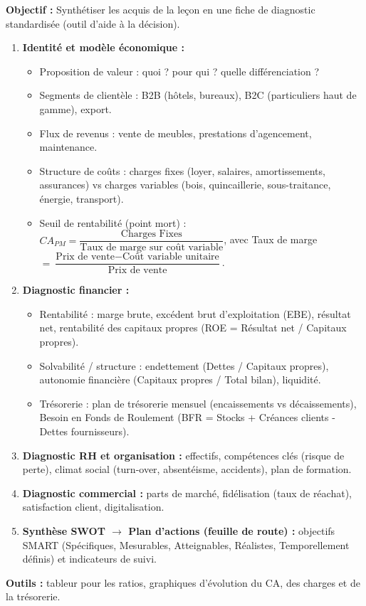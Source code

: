 \documentclass[11pt]{article}
\newcommand{\cle}[1]{{\popxbold\color{popdark}#1}}
\begin{document}
\begin{methode}
    \textbf{Objectif :} Synthétiser les acquis de la leçon en une fiche de diagnostic standardisée (outil d'aide à la décision).
    \begin{enumerate}
        \item \textbf{Identité et modèle économique :}
              \begin{itemize}
                  \item \cle{Proposition de valeur} : quoi ? pour qui ? quelle différenciation ?
                  \item \cle{Segments de clientèle} : B2B (hôtels, bureaux), B2C (particuliers haut de gamme), export.
                  \item \cle{Flux de revenus} : vente de meubles, prestations d'agencement, maintenance.
                  \item \cle{Structure de coûts} : charges fixes (loyer, salaires, amortissements, assurances) vs charges variables (bois, quincaillerie, sous-traitance, énergie, transport).
                  \item \cle{Seuil de rentabilité (point mort)} : $CA_{PM} = \dfrac{\text{Charges Fixes}}{\text{Taux de marge sur coût variable}}$, avec \cle{Taux de marge} $= \dfrac{\text{Prix de vente} - \text{Coût variable unitaire}}{\text{Prix de vente}}$.
              \end{itemize}
        \item \textbf{Diagnostic financier :}
              \begin{itemize}
                  \item \cle{Rentabilité} : marge brute, excédent brut d'exploitation (EBE), résultat net, rentabilité des capitaux propres (ROE = Résultat net / Capitaux propres).
                  \item \cle{Solvabilité / structure} : endettement (Dettes / Capitaux propres), autonomie financière (Capitaux propres / Total bilan), liquidité.
                  \item \cle{Trésorerie} : plan de trésorerie mensuel (encaissements vs décaissements), Besoin en Fonds de Roulement (BFR = Stocks + Créances clients - Dettes fournisseurs).
              \end{itemize}
        \item \textbf{Diagnostic RH et organisation :} effectifs, compétences clés (risque de perte), climat social (turn-over, absentéisme, accidents), plan de formation.
        \item \textbf{Diagnostic commercial :} parts de marché, fidélisation (taux de réachat), satisfaction client, digitalisation.
        \item \textbf{Synthèse SWOT $\rightarrow$ Plan d'actions (feuille de route) :} objectifs SMART (Spécifiques, Mesurables, Atteignables, Réalistes, Temporellement définis) et indicateurs de suivi.
    \end{enumerate}
    \textbf{Outils :} tableur pour les ratios, graphiques d'évolution du CA, des charges et de la trésorerie.
\end{methode}
\end{document}
